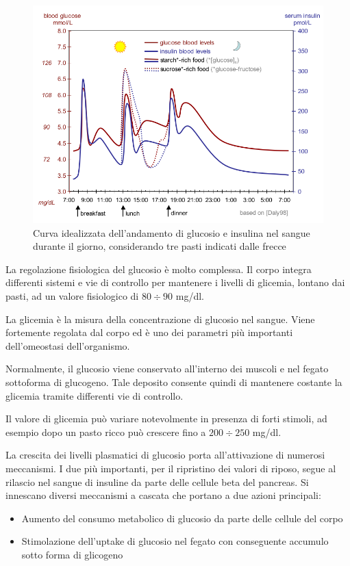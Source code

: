 \begin{figure}[b!]
	\centering
	\includegraphics[width=0.99\linewidth]{figures/glucose_regolation2}
	\caption{Curva idealizzata dell'andamento di glucosio e insulina nel sangue durante il giorno, considerando tre pasti indicati dalle frecce \cite{daly_acute_1998}}
	\label{fig:glucoseregolation2}
\end{figure}

La regolazione fisiologica del glucosio è molto complessa. Il corpo integra differenti sistemi e vie di controllo per mantenere i livelli di glicemia, lontano dai pasti, ad un valore fisiologico di $80\div 90$ mg/dl.

La glicemia è la misura della concentrazione di glucosio nel sangue. Viene fortemente regolata dal corpo ed è uno dei parametri più importanti dell'omeostasi dell'organismo. 

Normalmente, il glucosio viene conservato all'interno dei muscoli e nel fegato sottoforma di glucogeno. Tale deposito consente quindi di mantenere costante la glicemia tramite differenti vie di controllo.

Il valore di glicemia può variare notevolmente in presenza di forti stimoli, ad esempio dopo un pasto ricco può crescere fino a $200\div 250$ mg/dl.

La crescita dei livelli plasmatici di glucosio porta all'attivazione di numerosi meccanismi. I due più importanti, per il ripristino dei valori di riposo, segue al rilascio nel sangue di insuline da parte delle cellule beta del pancreas. Si innescano diversi meccanismi a cascata che portano a due azioni principali:
\begin{itemize}
	\item Aumento del consumo metabolico di glucosio da parte delle cellule del corpo
	\item Stimolazione dell'uptake di glucosio nel fegato con conseguente accumulo sotto forma di glicogeno
\end{itemize}

